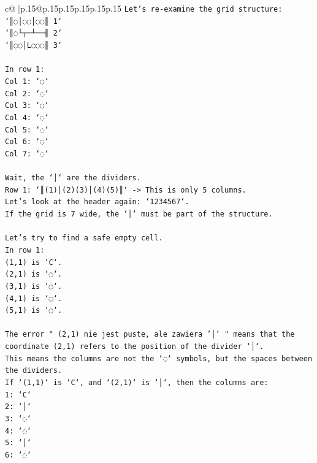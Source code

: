 \documentclass{article}
\begin{document}
{\begin{supertabular}{c@{$\;$}|p{.15\linewidth}@{}p{.15\linewidth}p{.15\linewidth}p{.15\linewidth}p{.15\linewidth}p{.15\linewidth}}
{{{\texttt{Let's re{-}examine the grid structure:} \\
\texttt{`║◌│◌◌│◌◌║ 1`} \\
\texttt{`║◌└┬─┴──╢ 2`} \\
\texttt{`║◌◌│L◌◌◌║ 3`} \\
\\ 
\texttt{In row 1:} \\
\texttt{Col 1: `◌`} \\
\texttt{Col 2: `◌`} \\
\texttt{Col 3: `◌`} \\
\texttt{Col 4: `◌`} \\
\texttt{Col 5: `◌`} \\
\texttt{Col 6: `◌`} \\
\texttt{Col 7: `◌`} \\
\\ 
\texttt{Wait, the `│` are the dividers.} \\
\texttt{Row 1: `║(1)│(2)(3)│(4)(5)║` {-}> This is only 5 columns.} \\
\texttt{Let's look at the header again: `1234567`.} \\
\texttt{If the grid is 7 wide, the `│` must be part of the structure.} \\
\\ 
\texttt{Let's try to find a safe empty cell.} \\
\texttt{In row 1:} \\
\texttt{(1,1) is `C`.} \\
\texttt{(2,1) is `◌`.} \\
\texttt{(3,1) is `◌`.} \\
\texttt{(4,1) is `◌`.} \\
\texttt{(5,1) is `◌`.} \\
\\ 
\texttt{The error " (2,1) nie jest puste, ale zawiera '│' " means that the coordinate (2,1) refers to the position of the divider `│`.} \\
\texttt{This means the columns are not the `◌` symbols, but the spaces between the dividers.} \\
\texttt{If `(1,1)` is `C`, and `(2,1)` is `│`, then the columns are:} \\
\texttt{1: `C`} \\
\texttt{2: `│`} \\
\texttt{3: `◌`} \\
\texttt{4: `◌`} \\
\texttt{5: `│`} \\
\texttt{6: `◌`} \\
}}}
\end{supertabular}}
\end{document}

